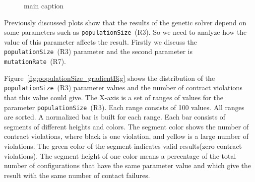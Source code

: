 \begin{figure}
	
	
	\caption{main caption}
	\label{fig:populationSize_gradient}
\end{figure}

Previously discussed plots show that the results of the genetic solver depend on some parameters such as \texttt{populationSize}~(R3). So we need to analyze how the value of this parameter affects the result. Firstly we discuss the \texttt{populationSize}~(R3) parameter and the second parameter is \texttt{mutationRate}~(R7).

Figure~\ref{fig:populationSize_gradientBig} shows the distribution of the \texttt{populationSize}~(R3) parameter values and the number of contract violations that this value could give. The X-axis is a set of ranges of values for the parameter \texttt{populationSize}~(R3). Each range consists of 100 values. All ranges are sorted. A normalized bar is built for each range. Each bar consists of segments of different heights and colors. The segment color shows the number of contract violations, where black is one violation, and yellow is a large number of violations. The green color of the segment indicates valid results(zero contract violations). The segment height of one color means a percentage of the total number of configurations that have the same parameter value and which give the result with the same number of contact failures.

